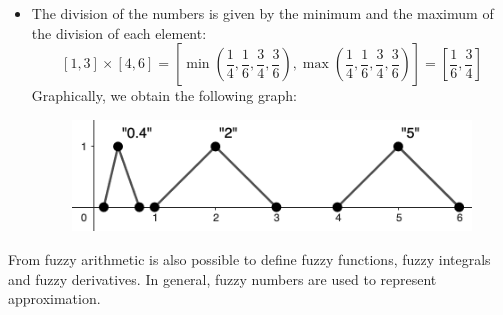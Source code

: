 \documentclass[12pt, a4paper]{report}
\theoremstyle{remark}
\begin{document}
\begin{example}
\begin{itemize}
            \item The division of the numbers is given by the minimum and the maximum of the division of each element:
            \[[1,3] \times [4,6]=[\min(\frac{1}{4}, \frac{1}{6}, \frac{3}{4}, \frac{3}{6}),\max(\frac{1}{4}, \frac{1}{6}, \frac{3}{4}, \frac{3}{6})]=[\frac{1}{6},\frac{3}{4}]\]
                Graphically, we obtain the following graph:
                \begin{figure}[H]
                    \centering
                    \includegraphics[width=0.5\linewidth]{images/division.png}
                \end{figure}
        \end{itemize}
    \end{example}
    
    From fuzzy arithmetic is also possible to define fuzzy functions, fuzzy integrals and fuzzy derivatives. In general, fuzzy numbers are used 
    to represent approximation.
\end{document}
